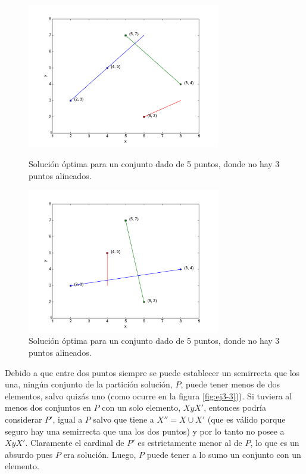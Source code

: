 \begin{figure}[H]
  \centering
  \begin{minipage}{0.49\textwidth}
  \includegraphics[width=0.75\textwidth]{img/ejemplos/ej3-3.pdf}
  \caption{\footnotesize Solución óptima para un conjunto dado de 5 puntos, donde no hay 3 puntos alineados.}
  \label{fig:ej3-3}
  \end{minipage}%
  \hspace{0.01\textwidth}
  \begin{minipage}{0.49\textwidth}
  \includegraphics[width=0.75\textwidth]{img/ejemplos/ej3-4.pdf}
  \caption{\footnotesize Solución óptima para un conjunto dado de 5 puntos, donde no hay 3 puntos alineados.}
  \label{fig:ej3-4}
  \end{minipage}%
\end{figure}

Debido a que entre dos puntos siempre se puede establecer un semirrecta que los una, ningún conjunto de la partición solución, $P$, puede tener menos de dos elementos, salvo quizás uno (como ocurre en la figura \ref{fig:ej3-3})). Si tuviera al menos dos conjuntos en $P$ con un solo elemento, $X y X'$, entonces podría considerar $P'$, igual a $P$ salvo que tiene a $X'' = X \cup X'$ (que es válido porque seguro hay una semirrecta que una los dos puntos) y por lo tanto no posee a $X y X'$. Claramente el cardinal de $P'$ es estrictamente menor al de $P$, lo que es un absurdo pues $P$ era solución. Luego, $P$ puede tener a lo sumo un conjunto con un elemento.

